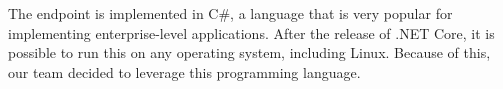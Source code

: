 The endpoint is implemented in C#, a language that is very popular for implementing enterprise-level applications.
After the release of .NET Core, it is possible to run this on any operating system, including Linux.
Because of this, our team decided to leverage this programming language.
